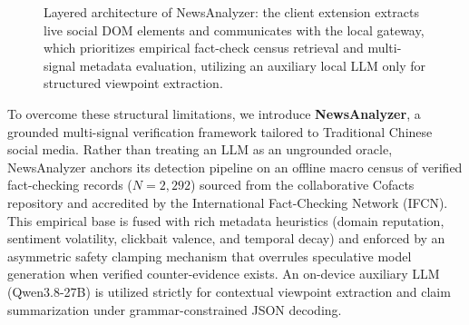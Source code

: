 \documentclass[twoside]{llncs}
\begin{document}
\begin{figure}[!htbp]
\caption{Layered architecture of NewsAnalyzer: the client extension extracts live social DOM elements and communicates with the local gateway, which prioritizes empirical fact-check census retrieval and multi-signal metadata evaluation, utilizing an auxiliary local LLM only for structured viewpoint extraction.}
\label{fig:arch}
\end{figure}

To overcome these structural limitations, we introduce \textbf{NewsAnalyzer}, a grounded multi-signal verification framework tailored to Traditional Chinese social media. Rather than treating an LLM as an ungrounded oracle, NewsAnalyzer anchors its detection pipeline on an offline macro census of verified fact-checking records ($N=2{,}292$) sourced from the collaborative Cofacts repository and accredited by the International Fact-Checking Network (IFCN). This empirical base is fused with rich metadata heuristics (domain reputation, sentiment volatility, clickbait valence, and temporal decay) and enforced by an asymmetric safety clamping mechanism that overrules speculative model generation when verified counter-evidence exists. An on-device auxiliary LLM (Qwen3.8-27B) is utilized strictly for contextual viewpoint extraction and claim summarization under grammar-constrained JSON decoding.
\end{document}
